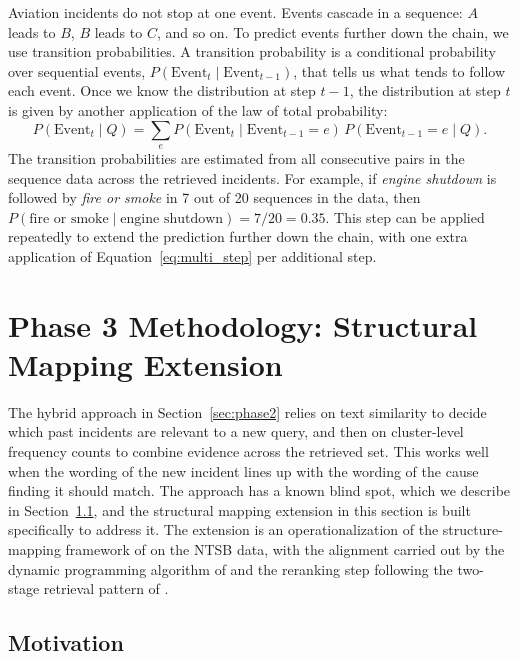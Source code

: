 \documentclass[11pt]{article}
\begin{document}
Aviation incidents do not stop at one event. Events cascade in a sequence: $A$ leads to $B$, $B$ leads to $C$, and so on. To predict events further down the chain, we use transition probabilities. A transition probability is a conditional probability over sequential events, $P(\text{Event}_t \mid \text{Event}_{t-1})$, that tells us what tends to follow each event. Once we know the distribution at step $t-1$, the distribution at step $t$ is given by another application of the law of total probability:
\begin{equation}
P(\text{Event}_t \mid Q) = \sum_{e} P(\text{Event}_t \mid \text{Event}_{t-1} = e) \, P(\text{Event}_{t-1} = e \mid Q).
\label{eq:multi_step}
\end{equation}
The transition probabilities are estimated from all consecutive pairs in the sequence data across the retrieved incidents. For example, if \emph{engine shutdown} is followed by \emph{fire or smoke} in 7 out of 20 sequences in the data, then $P(\text{fire or smoke} \mid \text{engine shutdown}) = 7 / 20 = 0.35$. This step can be applied repeatedly to extend the prediction further down the chain, with one extra application of Equation~\ref{eq:multi_step} per additional step.

\section{Phase 3 Methodology: Structural Mapping Extension}
\label{sec:phase3}

The hybrid approach in Section~\ref{sec:phase2} relies on text similarity to decide which past incidents are relevant to a new query, and then on cluster-level frequency counts to combine evidence across the retrieved set. This works well when the wording of the new incident lines up with the wording of the cause finding it should match. The approach has a known blind spot, which we describe in Section~\ref{sec:phase3:motivation}, and the structural mapping extension in this section is built specifically to address it. The extension is an operationalization of the structure-mapping framework of \citet{Gentner1983} on the NTSB data, with the alignment carried out by the dynamic programming algorithm of \citet{NeedlemanWunsch1970} and the reranking step following the two-stage retrieval pattern of \citet{NogueiraCho2019}.

\subsection{Motivation}
\label{sec:phase3:motivation}
\end{document}
